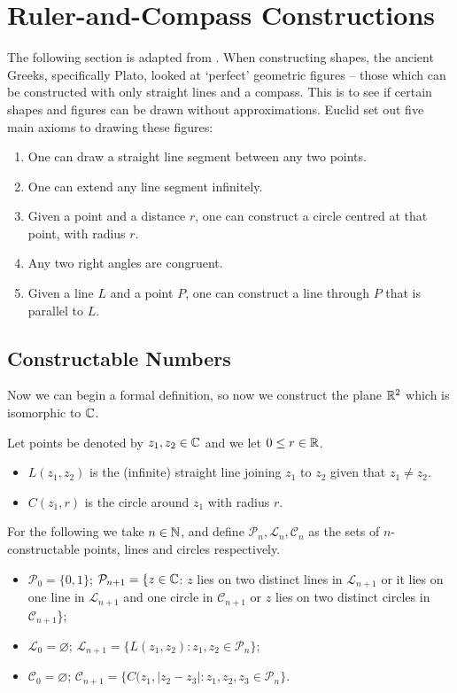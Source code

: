 \section{Ruler-and-Compass Constructions} \label{sec:applications}

The following section is adapted from \cite{Stewart, shape-constructions}. When constructing shapes, the ancient Greeks, specifically Plato, looked at `perfect' geometric figures -- those which can be constructed with only straight lines and a compass. This is to see if certain shapes and figures can be drawn without approximations. Euclid set out five main axioms to drawing these figures:

\begin{enumerate}
    \item One can draw a straight line segment between any two points.
    \item One can extend any line segment infinitely.
    \item Given a point and a distance $r$, one can construct a circle centred at that point, with radius $r$.
    \item Any two right angles are congruent.
    \item Given a line $L$ and a point $P$, one can construct a line through $P$ that is parallel to $L$. 
\end{enumerate}

\subsection{Constructable Numbers}

Now we can begin a formal definition, so now we construct the plane $\mathbb R^2$ which is isomorphic to $\mathbb C$. 
\begin{definition}
Let points be denoted by $z_1,z_2 \in \mathbb C$ and we let $0\leq r \in \mathbb R$.
    \begin{itemize}
        \item $L(z_1,z_2)$ is the (infinite) straight line joining $z_1$ to $z_2$ given that $z_1 \neq z_2$. 
        \item $C(z_1,r)$ is the circle around $z_1$ with radius $r$.
    \end{itemize}
    For the following we take $n \in \mathbb N$, and define $\mathcal{P}_n,\mathcal{L}_n,\mathcal{C}_n$ as the sets of $n$-constructable points, lines and circles respectively.
    \begin{itemize}
        \item $\mathcal{P}_0=\{0,1\}$; $\mathcal{P}_{n+1}=\{z\in \mathbb C $: $z$ lies on two distinct lines in $\mathcal{L}_{n+1}$ or it lies on one line in $\mathcal{L}_{n+1}$ and one circle in $\mathcal{C}_{n+1}$ or $z$ lies on two distinct circles in $\mathcal{C}_{n+1}$\};
        \item $\mathcal{L}_0=\varnothing$; $\mathcal{L}_{n+1}=\{L(z_1,z_2) : z_1,z_2\in \mathcal{P}_n\}$;
        \item $\mathcal{C}_0=\varnothing$; $\mathcal{C}_{n+1}=\{C(z_1,|z_2-z_3|:z_1,z_2,z_3\in \mathcal{P}_n\}$.
    \end{itemize}
\end{definition}

